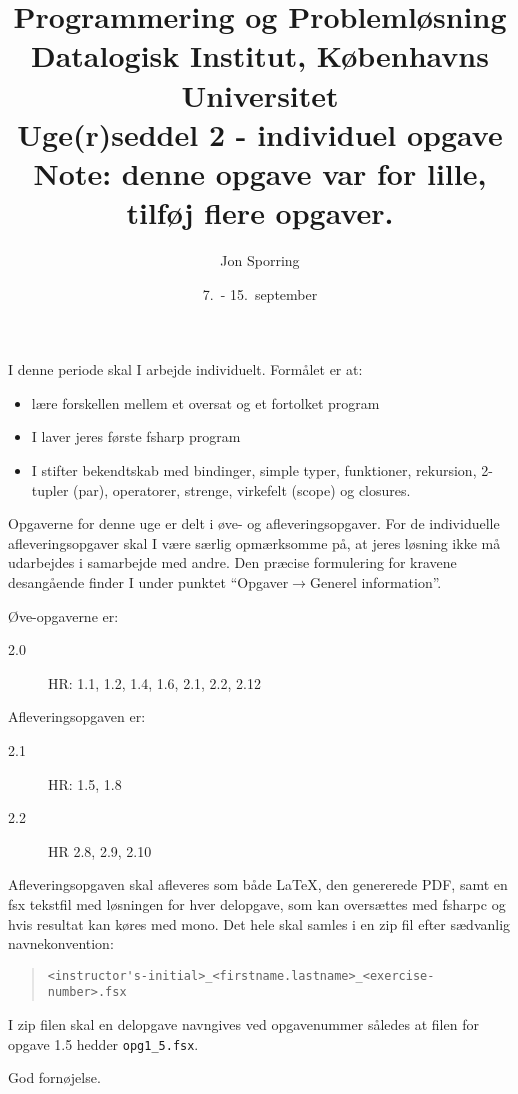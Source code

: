 \documentclass[a4paper,12pt]{article}
\title{Programmering og Problemløsning\\Datalogisk Institut,
  Københavns Universitet\\Uge(r)seddel 2 - individuel opgave\\Note:
  denne opgave var for lille, tilføj flere opgaver.}
\author{Jon Sporring}
\date{7.\ - 15.\ september}
\begin{document}
\maketitle

I denne periode skal I arbejde individuelt. Formålet er at:
\begin{itemize}
\item lære forskellen mellem et oversat og et fortolket program
\item I laver jeres første fsharp program
\item I stifter bekendtskab med bindinger, simple typer, funktioner,
  rekursion, 2-tupler (par), operatorer, strenge, virkefelt (scope) og closures.
\end{itemize}

Opgaverne for denne uge er delt i øve- og afleveringsopgaver. For de individuelle afleveringsopgaver skal I være særlig opmærksomme på, at jeres løsning ikke må udarbejdes i samarbejde med andre. Den præcise formulering for kravene desangående finder I under punktet "`Opgaver$\rightarrow$Generel information"'.

Øve-opgaverne er:
\begin{description}
\item[2.0] HR: 1.1, 1.2, 1.4, 1.6, 2.1, 2.2, 2.12
\end{description}

Afleveringsopgaven er:
\begin{description}
\item[2.1] HR: 1.5, 1.8
\item[2.2] HR 2.8, 2.9, 2.10
\end{description}
Afleveringsopgaven skal afleveres som både LaTeX, den genererede PDF, samt en fsx tekstfil med løsningen for hver delopgave, som kan oversættes med fsharpc og hvis resultat kan køres med mono. Det hele skal samles i en zip fil efter sædvanlig navnekonvention:
\begin{quote}
  \lstinline|<instructor's-initial>_<firstname.lastname>_<exercise-number>.fsx|
\end{quote}
I zip filen skal en delopgave navngives ved opgavenummer således at filen for opgave 1.5 hedder \lstinline|opg1_5.fsx|.

\flushright God fornøjelse.
\end{document}
